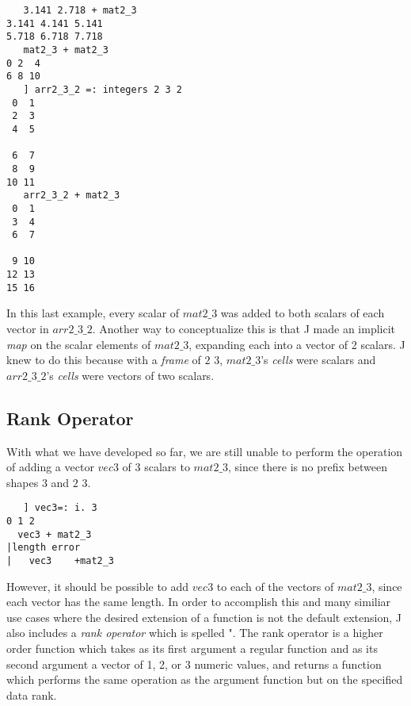 \begin{verbatim}
   3.141 2.718 + mat2_3
3.141 4.141 5.141
5.718 6.718 7.718
   mat2_3 + mat2_3
0 2  4
6 8 10
   ] arr2_3_2 =: integers 2 3 2
 0  1
 2  3
 4  5

 6  7
 8  9
10 11
   arr2_3_2 + mat2_3
 0  1
 3  4
 6  7

 9 10
12 13
15 16
\end{verbatim}

In this last example, every scalar of $mat2\_3$ was added to both scalars of each vector in $arr2\_3\_2$. 
Another way to conceptualize this is that J made an implicit \textit{map} on the scalar elements of $mat2\_3$, 
expanding each into a vector of 2 scalars.
J knew to do this because with a \textit{frame} of $2$ $3$, $mat2\_3$'s \textit{cells} were scalars and 
$arr2\_3\_2$'s \textit{cells} were vectors of two scalars.

\subsection{Rank Operator}
With what we have developed so far, we are still unable to perform the operation of 
adding a vector $vec3$ of 3 scalars to $mat2\_3$, since there is no prefix between shapes $3$ and $2$ $3$.

\begin{verbatim}
   ] vec3=: i. 3
0 1 2
  vec3 + mat2_3
|length error
|   vec3    +mat2_3
\end{verbatim}

However, it should be possible to add $vec3$ to each of the vectors of $mat2\_3$, since each vector has the same length.
In order to accomplish this and many similiar use cases where the desired extension of a function is not the default extension, 
J also includes a \textit{rank operator} which is spelled \ttfamily"\normalfont.
The rank operator is a higher order function which takes as its first argument a regular function 
and as its second argument a vector of 1, 2, or 3 numeric values, 
and returns a function which performs the same operation as the argument function but on the specified data rank.\cite{rankanduni}

